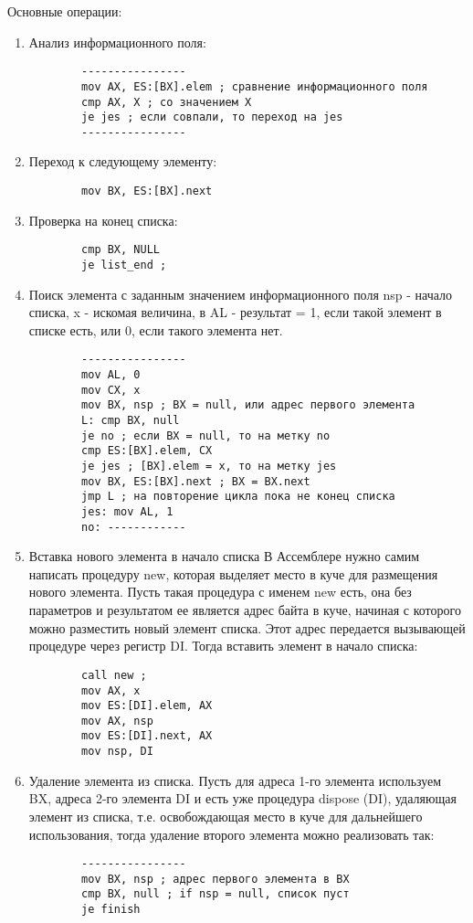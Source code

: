 Основные операции:
\begin{enumerate}
    \item Анализ информационного поля:
    \begin{verbatim}
        ----------------
        mov AX, ES:[BX].elem ; сравнение информационного поля
        cmp AX, X ; со значением X
        je jes ; если совпали, то переход на jes
        ----------------
    \end{verbatim}
    \item Переход к следующему элементу:
    \begin{verbatim}
        mov BX, ES:[BX].next
    \end{verbatim}
    \item Проверка на конец списка:
    \begin{verbatim}
        cmp BX, NULL
        je list_end ;
    \end{verbatim}
    \item Поиск элемента с заданным значением информационного поля
    nsp - начало списка, x - искомая величина, в AL - результат = 1, если такой элемент в списке есть, или 0, если такого элемента нет.
    \begin{verbatim}
        ----------------
        mov AL, 0
        mov CX, x
        mov BX, nsp ; BX = null, или адрес первого элемента
        L: cmp BX, null
        je no ; если BX = null, то на метку no
        cmp ES:[BX].elem, CX
        je jes ; [BX].elem = x, то на метку jes
        mov BX, ES:[BX].next ; BX = BX.next
        jmp L ; на повторение цикла пока не конец списка
        jes: mov AL, 1
        no: ------------
    \end{verbatim}
    \item Вставка нового элемента в начало списка
    В Ассемблере нужно самим написать процедуру new, которая выделяет место в куче для размещения нового элемента. Пусть такая процедура с именем new есть, она без параметров и результатом ее является адрес байта в куче,
    начиная с которого можно разместить новый элемент списка. Этот адрес передается вызывающей процедуре через регистр DI. Тогда вставить элемент в начало списка:
    \begin{verbatim}
        call new ;
        mov AX, x
        mov ES:[DI].elem, AX
        mov AX, nsp
        mov ES:[DI].next, AX
        mov nsp, DI
    \end{verbatim}
    \begin{figure}[H]
    \end{figure}
    \item Удаление элемента из списка.
    Пусть для адреса 1-го элемента используем BX, адреса 2-го элемента DI и есть уже процедура dispose (DI), удаляющая элемент из списка, т.е. освобождающая место в куче для дальнейшего использования, тогда удаление второго элемента можно реализовать так:
    \begin{verbatim}
        ----------------
        mov BX, nsp ; адрес первого элемента в BX
        cmp BX, null ; if nsp = null, список пуст
        je finish


\end{verbatim}
\end{enumerate}
